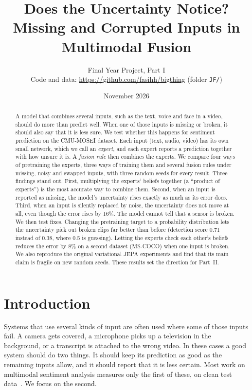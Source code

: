 \documentclass[10pt,twocolumn]{article}
\title{\vspace{-1.2em}\textbf{Does the Uncertainty Notice? Missing and Corrupted Inputs in Multimodal Fusion}}
\author{Final Year Project, Part I \\ \small Code and data: \url{https://github.com/fasihh/bigthing} (folder \texttt{JF/})}
\date{\small November 2026}
\begin{document}
\maketitle

\begin{abstract}
A model that combines several inputs, such as the text, voice and face in a video, should do more than predict well.
When one of those inputs is missing or broken, it should also say that it is less sure. We test whether this happens
for sentiment prediction on the CMU-MOSEI dataset. Each input (text, audio, video) has its own small network, which we
call an \emph{expert}, and each expert reports a prediction together with how unsure it is. A \emph{fusion rule}
then combines the experts. We compare four ways of pretraining the experts, three ways of training them and several
fusion rules under missing, noisy and swapped inputs, with three random seeds for every result.
Three findings stand out. First, multiplying the experts' beliefs together (a ``product of experts'') is the most
accurate way to combine them. Second, when an input is reported as missing, the model's uncertainty rises exactly as
much as its error does. Third, when an input is silently replaced by noise, the uncertainty does not move at all, even
though the error rises by 16\%. The model cannot tell that a sensor is broken.
We then test fixes. Changing the pretraining target to a probability distribution lets the uncertainty pick out broken
clips far better than before (detection score 0.71 instead of 0.38, where 0.5 is guessing). Letting the experts check
each other's beliefs reduces the error by 8\% on a second dataset (MS-COCO) when one input is broken. We also reproduce
the original variational JEPA experiments and find that its main claim is fragile on new random seeds. These results set
the direction for Part~II.
\end{abstract}

\section{Introduction}
Systems that use several kinds of input are often used where some of those inputs fail. A camera gets covered, a
microphone picks up a television in the background, or a transcript is attached to the wrong video. In these cases a
good system should do two things. It should keep its prediction as good as the remaining inputs allow, and it should
report that it is less certain. Most work on multimodal sentiment analysis measures only the first of these, on clean
test data~\cite{zadeh2018mosei,mao2022msena}. We focus on the second.
\end{document}
